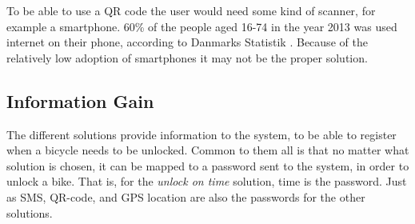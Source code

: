 To be able to use a QR code the user would need some kind of scanner, for example a smartphone.
60\% of the people aged 16-74 in the year 2013 was used internet on their phone, according to Danmarks Statistik \citep{misc:dstMobilephone}.
Because of the relatively low adoption of smartphones it may not be the proper solution.

\subsection{Information Gain}
The different solutions provide information to the system, to be able to register when a bicycle needs to be unlocked.
Common to them all is that no matter what solution is chosen, it can be mapped to a password sent to the system, in order to unlock a bike.
That is, for the \textit{unlock on time} solution, time is the password.
Just as SMS, QR-code, and GPS location are also the passwords for the other solutions.